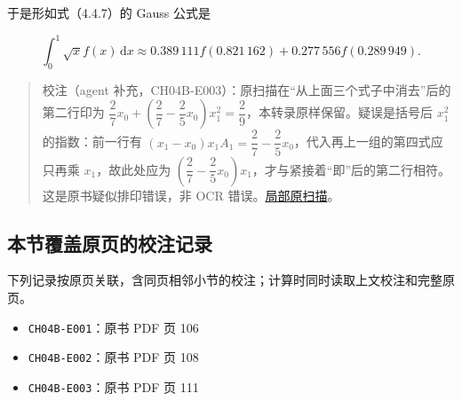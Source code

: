 \documentclass[
  10pt,
  fontset=fandol]{ctexart}
\providecommand{\tightlist}{%
  \setlength{\itemsep}{0pt}\setlength{\parskip}{0pt}}
\begin{document}
于是形如式（4.4.7）的 Gauss 公式是

\[
\int_0^1\sqrt{x}f(x)\,\mathrm{d}x
\approx0.389\,111f(0.821\,162)+0.277\,556f(0.289\,949).
\]

\begin{quote}
校注（agent 补充，CH04B-E003）：原扫描在``从上面三个式子中消去''后的第二行印为 \(\dfrac27x_0+\left(\dfrac27-\dfrac25x_0\right)x_1^2=\dfrac29\)，本转录原样保留。疑误是括号后 \(x_1^2\) 的指数：前一行有 \((x_1-x_0)x_1A_1=\dfrac27-\dfrac25x_0\)，代入再上一组的第四式应只再乘 \(x_1\)，故此处应为 \(\left(\dfrac27-\dfrac25x_0\right)x_1\)，才与紧接着``即''后的第二行相符。这是原书疑似排印错误，非 OCR 错误。\href{../assets/ch04b/review-p111-elimination.png}{局部原扫描}。
\end{quote}

\subsection{本节覆盖原页的校注记录}\label{ux672cux8282ux8986ux76d6ux539fux9875ux7684ux6821ux6ce8ux8bb0ux5f55}

下列记录按原页关联，含同页相邻小节的校注；计算时同时读取上文校注和完整原页。

\begin{itemize}
\tightlist
\item
  \texttt{CH04B-E001}：原书 PDF 页 106
\item
  \texttt{CH04B-E002}：原书 PDF 页 108
\item
  \texttt{CH04B-E003}：原书 PDF 页 111
\end{itemize}
\end{document}
